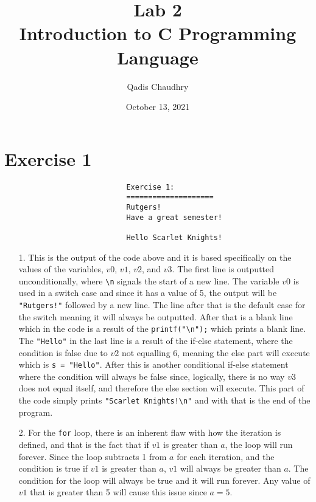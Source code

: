 \documentclass[12pt]{article}
\title{Lab 2 \\ Introduction to C Programming Language}
\author{Qadis Chaudhry}
\date{October 13, 2021}
\begin{document}
\maketitle
    \section*{Exercise 1}
    \begin{verbatim}
                            Exercise 1:
                            ====================
                            Rutgers!
                            Have a great semester!

                            Hello Scarlet Knights!
    \end{verbatim}
    \begin{itemize}
        \item[1.]
            This is the output of the code above and it is based specifically on
            the values of the variables, $v0$, $v1$, $v2$, and $v3$. The first
            line is outputted unconditionally, where \verb+\n+ signals the start
            of a new line. The variable $v 0$ is used in a switch case and since
            it has a value of 5, the output will be \verb+"Rutgers!"+ followed
            by a new line. The line after that is the default case for the
            switch meaning it will always be outputted. After that is a blank
            line which in the code is a result of the \verb+printf("\n");+ which
            prints a blank line. The \verb+"Hello"+ in the last line is a result
            of the if-else statement, where the condition is false due to $v 2$
            not equalling 6, meaning the else part will execute which is \verb+s = "Hello"+.
            After this is another conditional if-else statement where the
            condition will always be false since, logically, there is no way $v
            3$ does not equal itself, and therefore the else section will
            execute. This part of the code simply prints \verb+"Scarlet Knights!\n"+
            and with that is the end of the program.
        \item[2.]
            For the \verb+for+ loop, there is an inherent flaw with how the
            iteration is defined, and that is the fact that if $v 1$ is greater
            than $a$, the loop will run forever. Since the loop subtracts 1 from
            $a$ for each iteration, and the condition is true if $v 1$ is
            greater than $a$, $v 1$ will always be greater than $a$. The
            condition for the loop will always be true and it will run forever.
            Any value of $v 1$ that is greater than 5 will cause this issue
            since $a=5$.
    \end{itemize}
\end{document}
